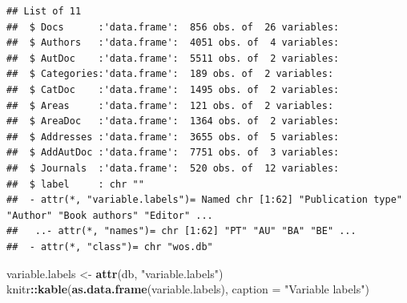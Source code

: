 \documentclass[
]{book}
\newenvironment{Shaded}{\begin{snugshade}}{\end{snugshade}}
\newcommand{\AttributeTok}[1]{\textcolor[rgb]{0.13,0.29,0.53}{#1}}
\newcommand{\FunctionTok}[1]{\textcolor[rgb]{0.13,0.29,0.53}{\textbf{#1}}}
\newcommand{\NormalTok}[1]{#1}
\newcommand{\OtherTok}[1]{\textcolor[rgb]{0.56,0.35,0.01}{#1}}
\newcommand{\SpecialCharTok}[1]{\textcolor[rgb]{0.81,0.36,0.00}{\textbf{#1}}}
\newcommand{\StringTok}[1]{\textcolor[rgb]{0.31,0.60,0.02}{#1}}
\begin{document}
\begin{verbatim}
## List of 11
##  $ Docs      :'data.frame':  856 obs. of  26 variables:
##  $ Authors   :'data.frame':  4051 obs. of  4 variables:
##  $ AutDoc    :'data.frame':  5511 obs. of  2 variables:
##  $ Categories:'data.frame':  189 obs. of  2 variables:
##  $ CatDoc    :'data.frame':  1495 obs. of  2 variables:
##  $ Areas     :'data.frame':  121 obs. of  2 variables:
##  $ AreaDoc   :'data.frame':  1364 obs. of  2 variables:
##  $ Addresses :'data.frame':  3655 obs. of  5 variables:
##  $ AddAutDoc :'data.frame':  7751 obs. of  3 variables:
##  $ Journals  :'data.frame':  520 obs. of  12 variables:
##  $ label     : chr ""
##  - attr(*, "variable.labels")= Named chr [1:62] "Publication type" "Author" "Book authors" "Editor" ...
##   ..- attr(*, "names")= chr [1:62] "PT" "AU" "BA" "BE" ...
##  - attr(*, "class")= chr "wos.db"
\end{verbatim}

\begin{Shaded}
\begin{Highlighting}[]
\NormalTok{variable.labels }\OtherTok{\textless{}{-}} \FunctionTok{attr}\NormalTok{(db, }\StringTok{"variable.labels"}\NormalTok{)}
\NormalTok{knitr}\SpecialCharTok{::}\FunctionTok{kable}\NormalTok{(}\FunctionTok{as.data.frame}\NormalTok{(variable.labels),}
             \AttributeTok{caption =} \StringTok{"Variable labels"}\NormalTok{)}
\end{Highlighting}
\end{Shaded}
\end{document}
